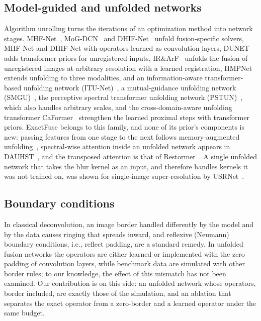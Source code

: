 \documentclass[journal]{IEEEtran}
\begin{document}
\subsection{Model-guided and unfolded networks}
Algorithm unrolling turns the iterations of an optimization method into network stages. MHF-Net~\cite{xie2022mhfnet}, MoG-DCN~\cite{dong2021mogdcn} and DHIF-Net~\cite{huang2022dhif} unfold fusion-specific solvers, MHF-Net and DHIF-Net with operators learned as convolution layers, DUNET~\cite{fang2024dunet} adds transformer priors for unregistered inputs, IR\&ArF~\cite{qu2025irarf} unfolds the fusion of unregistered images at arbitrary resolution with a learned registration, HMPNet~\cite{tian2024hmpnet} extends unfolding to three modalities, and an information-aware transformer-based unfolding network (ITU-Net)~\cite{sun2025iatun}, a mutual-guidance unfolding network (SMGU)~\cite{yan2025smgu}, the perceptive spectral transformer unfolding network (PSTUN)~\cite{wang2025pstun}, which also handles arbitrary scales, and the cross-domain-aware unfolding transformer CaFormer~\cite{cao2026caformer} strengthen the learned proximal steps with transformer priors. ExactFuse belongs to this family, and none of its prior's components is new: passing features from one stage to the next follows memory-augmented unfolding~\cite{song2021madun}, spectral-wise attention inside an unfolded network appears in DAUHST~\cite{cai2022dauhst}, and the transposed attention is that of Restormer~\cite{zamir2022restormer}. A single unfolded network that takes the blur kernel as an input, and therefore handles kernels it was not trained on, was shown for single-image super-resolution by USRNet~\cite{zhang2020usrnet}.

\subsection{Boundary conditions}
In classical deconvolution, an image border handled differently by the model and by the data causes ringing that spreads inward, and reflexive (Neumann) boundary conditions, i.e., reflect padding, are a standard remedy. In unfolded fusion networks the operators are either learned or implemented with the zero padding of convolution layers, while benchmark data are simulated with other border rules; to our knowledge, the effect of this mismatch has not been examined. Our contribution is on this side: an unfolded network whose operators, border included, are exactly those of the simulation, and an ablation that separates the exact operator from a zero-border and a learned operator under the same budget.
\end{document}
